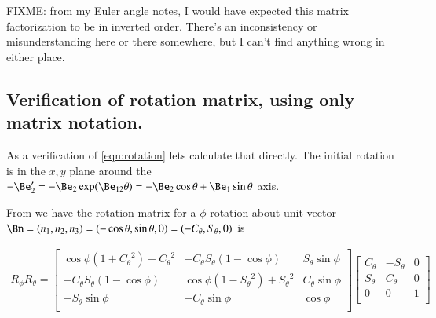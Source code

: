 \documentclass{article}
\begin{document}
FIXME: from my Euler angle notes, I would have expected this matrix factorization to be in inverted order.  There's an inconsistency
or misunderstanding here or there somewhere, but I can't find anything wrong in either place.


\subsection{ Verification of rotation matrix, using only matrix notation. }

As a verification of \ref{eqn:rotation} lets calculate that directly.  The initial rotation is in the $x,y$ plane around the $-\Be_2' = -\Be_2 \exp(\Be_{12}\theta) = -\Be_2 \cos\theta + \Be_1 \sin\theta$ axis.

From \cite{PJRotor} we have the rotation matrix for a $\phi$ rotation about
unit vector $\Bn = (n_1, n_2, n_3) = (-\cos\theta, \sin\theta, 0) = (-C_\theta, S_\theta, 0)$ is

\begin{align*}
R_\phi R_\theta
=
\begin{bmatrix}
\cos\phi(1 +{C_\theta}^2) - {C_\theta}^2 & -{C_\theta} {S_\theta} (1-\cos\phi) & {S_\theta} \sin\phi \\
-{C_\theta} {S_\theta} (1-\cos\phi) & \cos\phi(1 -{S_\theta}^2) + {S_\theta}^2 & {C_\theta} \sin\phi \\
-{S_\theta} \sin\phi & {-C_\theta} \sin\phi & \cos\phi \\
\end{bmatrix}
\begin{bmatrix}
C_\theta & -S_\theta & 0 \\
S_\theta & C_\theta & 0 \\
0 & 0 & 1 \\
\end{bmatrix}
\end{align*}




\end{document}

